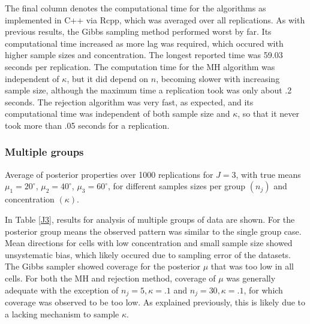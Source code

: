 \documentclass[bib]{ba/ba}
\begin{document}
The final column denotes the computational time for the algorithms as implemented in C++ via Rcpp, which was averaged over all replications. As with previous results, the Gibbs sampling method performed worst by far. Its computational time increased as more lag was required, which occured with higher sample sizes and concentration. The longest reported time was 59.03 seconds per replication. The computation time for the MH algorithm was independent of $\kappa$, but it did depend on $n$, becoming slower with increasing sample size, although the maximum time a replication took was only about .2 seconds. The rejection algorithm was very fast, as expected, and its computational time was independent of both sample size and $\kappa$, so that it never took more than .05 seconds for a replication. 




\subsubsection{Multiple groups}



\begin{table}
\centering
\begin{minipage}{1.02\textwidth}
\caption{Average of posterior properties over 1000 replications for $J=3$, with true means $\mu_1 = 20^\circ$, $\mu_2 = 40^\circ$, $\mu_3 = 60^\circ$, for different samples sizes per group $(n_j)$ and concentration $(\kappa)$.} 
\label{J3}



\vspace{-0.3cm}
\end{minipage}
\end{table}


In Table \ref{J3}, results for analysis of multiple groups of data are shown. For the posterior group means the observed pattern was similar to the single group case. Mean directions for cells with low concentration and small sample size showed unsystematic bias, which likely occured due to sampling error of the datasets. The Gibbs sampler showed coverage for the posterior $\mu$ that was too low in all cells. For both the MH and rejection method, coverage of $\mu$ was generally adequate with the exception of $n_j=5, \kappa=.1$ and $n_j=30, \kappa=.1$, for which coverage was observed to be too low. As explained previously, this is likely due to a lacking mechanism to sample $\kappa$. 
\end{document}
